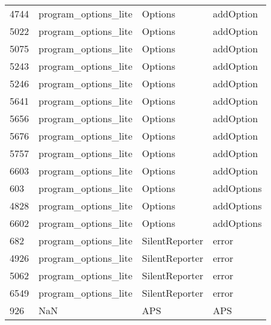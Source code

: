 \begin{tabular}{llll}
4744 &  program\_options\_lite &                    Options &                                 addOption \\
5022 &  program\_options\_lite &                    Options &                                 addOption \\
5075 &  program\_options\_lite &                    Options &                                 addOption \\
5243 &  program\_options\_lite &                    Options &                                 addOption \\
5246 &  program\_options\_lite &                    Options &                                 addOption \\
5641 &  program\_options\_lite &                    Options &                                 addOption \\
5656 &  program\_options\_lite &                    Options &                                 addOption \\
5676 &  program\_options\_lite &                    Options &                                 addOption \\
5757 &  program\_options\_lite &                    Options &                                 addOption \\
6603 &  program\_options\_lite &                    Options &                                 addOption \\
603  &  program\_options\_lite &                    Options &                                addOptions \\
4828 &  program\_options\_lite &                    Options &                                addOptions \\
6602 &  program\_options\_lite &                    Options &                                addOptions \\
682  &  program\_options\_lite &             SilentReporter &                                     error \\
4926 &  program\_options\_lite &             SilentReporter &                                     error \\
5062 &  program\_options\_lite &             SilentReporter &                                     error \\
6549 &  program\_options\_lite &             SilentReporter &                                     error \\
926  &                   NaN &                        APS &                                       APS \\

\end{tabular}
